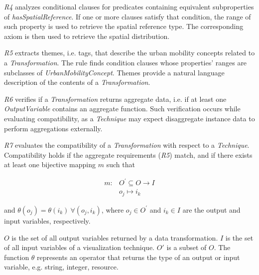 \documentclass[]{interact}
\theoremstyle{plain}%
\theoremstyle{definition}
\theoremstyle{remark}
\theoremstyle{definition}
\begin{document}
\textit{R4} analyzes conditional clauses for predicates containing  equivalent subproperties of \textit{hasSpatialReference}. If one or more clauses satisfy that condition, the range of such property is used to retrieve the spatial reference type. The corresponding axiom is then used to retrieve the spatial distribution. %

\textit{R5} extracts themes, i.e. tags, that describe the urban mobility concepts related to a \textit{Transformation}. The rule finds condition clauses whose properties' ranges are subclasses of \textit{UrbanMobilityConcept}. Themes provide a natural language description of the contents of a \textit{Transformation}.

\textit{R6} verifies if a \textit{Transformation} returns aggregate data, i.e. if at least one \textit{OutputVariable} contains an aggregate function. Such verification occurs while evaluating compatibility, as a \textit{Technique} may expect disaggregate instance data to perform aggregations externally.


\textit{R7} evaluates the compatibility of a \textit{Transformation} with respect to a \textit{Technique}. Compatibility holds if the aggregate requirements (\textit{R5}) match, and if there exists at least one bijective mapping $m$ such that

\begin{align*}
    m \colon & O^{\prime} \subseteq O \rightarrow I \\
    & o_j \longmapsto i_k
\end{align*}

and $\theta(o_j) = \theta(i_k) \ \forall (o_j,i_k)$, where $o_j \in O^{ \prime}$ and $i_k \in I$ are the output and input variables, respectively.

$O$ is the set of all output variables returned by a data transformation. $I$ is the set of all input variables of a visualization technique. $O'$ is a subset of $O$.
The function $\theta$ represents an operator that returns the type of an output or input variable, e.g. string, integer, resource.


\end{document}
